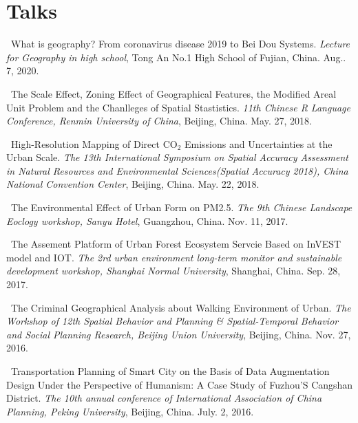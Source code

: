 \section*{Talks}
\begin{etaremune}
\item
    \Shaoqing\
    What is geography? From coronavirus disease 2019 to Bei Dou Systems.
    \textit{Lecture for Geography in high school}, Tong An No.1 High School of Fujian, China.
    Aug.. 7, 2020.
\item
    \Shaoqing\
    The Scale Effect, Zoning Effect of Geographical Features, the Modified Areal Unit Problem and the Chanlleges of Spatial Stastistics.
    \textit{11th Chinese R Language Conference, Renmin University of China}, Beijing, China.
    May. 27, 2018.
\item
    \Shaoqing\
    High-Resolution Mapping of Direct CO$_2$ Emissions and Uncertainties at the Urban Scale.
    \textit{The 13th International Symposium on Spatial Accuracy Assessment in Natural Resources and Environmental Sciences(Spatial Accuracy 2018), China National Convention Center}, Beijing, China.
    May. 22, 2018.
\item
    \Shaoqing\
    The Environmental Effect of Urban Form on PM2.5. 
    \textit{The 9th Chinese Landscape Eoclogy workshop, Sanyu Hotel}, Guangzhou, China.
    Nov. 11, 2017.
\item
    \Shaoqing\
    The Assement Platform of Urban Forest Ecosystem Servcie Based on InVEST model and IOT.
    \textit{The 2rd urban environment long-term monitor and sustainable development workshop, Shanghai Normal University}, Shanghai, China.
    Sep. 28, 2017.
    \invited
\item
    \Shaoqing\
    The Criminal Geographical Analysis about Walking Environment of Urban.
    \textit{The Workshop of 12th Spatial Behavior and Planning \& Spatial-Temporal Behavior and Social Planning Research, Beijing Union University}, Beijing, China.
    Nov. 27, 2016.
\item
    \Shaoqing\
    Transportation Planning of Smart City on the Basis of Data Augmentation Design Under the Perspective of Humanism: A Case Study of Fuzhou’S Cangshan District.
    \textit{The 10th annual conference of International Association of China Planning, Peking University}, Beijing, China.
    July. 2, 2016.
\end{etaremune}
